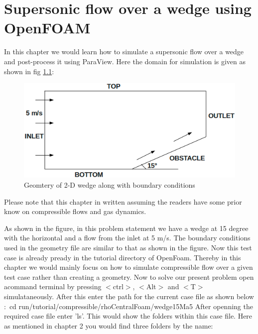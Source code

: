\documentclass[a4paper,12pt]{report}
\begin{document}
\setcounter{chapter}{4}

\chapter{Supersonic flow over a wedge using OpenFOAM}
\flushleft In this chapter we would learn how to simulate a supersonic flow over a wedge and post-process it using ParaView. Here the domain for simulation is given as shown in fig \ref{geometry}$:$

\begin{figure}[ht]  
\begin{center}  
\includegraphics[scale=0.7]{geometry.png}
\caption{Geomtery of 2-D wedge along with boundary conditions}
\label{geometry}
\end{center}  
\end{figure}

\flushleft Please note that this chapter in written assuming the readers have some prior know on compressible flows and gas dynamics.

\flushleft As shown in the figure, in this problem statement we have a wedge at 15 degree with the horizontal and a flow from the inlet at 5 m/s. The boundary conditions used in the geometry file are similar to that as shown in the figure. Now this test case is already pready in the tutorial directory of OpenFoam. Thereby in this chapter we would mainly focus on how to simulate compressible flow over a given test case rather than creating a geometry. 
\flushleft Now to solve our present problem open acommand terminal by pressing $<$ctrl$>$, $<$Alt$>$ and $<$T$>$ simulataneously. After this enter the path for the current case file as shown below$:$
\flushleft cd run/tutorial/compressible/rhoCentralFoam/wedge15Ma5
\flushleft After openning the required case file enter 'ls'. This would show the folders within this case file. Here as mentioned in chapter 2 you would find three folders by the name$:$
\end{document}
